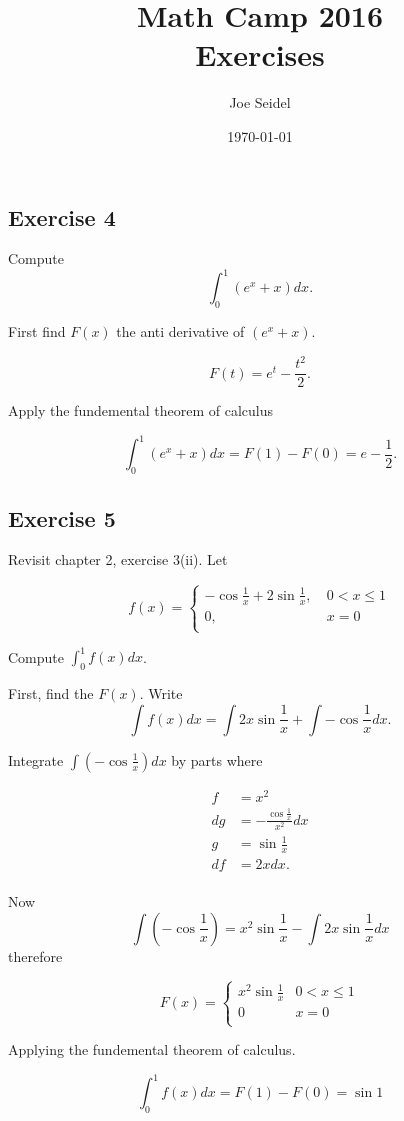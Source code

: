 \documentclass{tufte-book}
\title{Math Camp 2016\\Exercises }
\author{Joe Seidel}
\date{\today}
\theoremstyle{mytheoremstyle}
\theoremstyle{mylemstyle}
\theoremstyle{mydefstyle}
\begin{document}
\maketitle
{}
\newpage
{}

\subsection{Exercise 4}
Compute
\[ \int_0^1 (e^x + x) dx. \]

First find $F(x)$ the anti derivative of $(e^x +x)$.

\[ F(t) = e^t - \frac{t^2}{2}. \]

Apply the fundemental theorem of calculus

\[ \int_0^1 (e^x + x) dx = F(1) - F(0) = e - \frac{1}{2}. \]

\subsection{Exercise 5}
Revisit chapter 2, exercise 3(ii).  Let

\[ f(x) =
\begin{cases}
-\cos \frac{1}{x} + 2 \sin \frac{1}{x}, & \ 0 < x \leq 1\\
0, & \ x=0\\
\end{cases}
\]

Compute $\int_0^1 f(x) dx$.

First, find the $F(x)$. Write
\[ \int f(x) dx = \int 2x \sin\frac{1}{x} + \int -\cos \frac{1}{x} dx. \]

Integrate $\int (-\cos \frac{1}{x}) dx$ by parts where

\begin{align*}
f &= x^2\\
dg &= -\frac{\cos \frac{1}{x}}{x^2}dx \\
g &= \sin{\frac{1}{x}}\\
df &= 2xdx.\\
\end{align*}

Now
\[ \int (-\cos \frac{1}{x}) = x^2\sin \frac{1}{x} - \int 2x \sin\frac{1}{x} dx \]
therefore

\[ F(x) =
\begin{cases}
x^2 \sin \frac{1}{x} & 0 < x \leq 1\\
0 & x=0\\
\end{cases}
\]

Applying the fundemental theorem of calculus.

\[ \int_0^1 f(x) dx = F(1) - F(0) = \sin 1 \]
\end{document}
